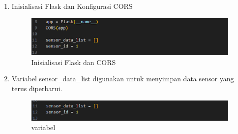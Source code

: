 \begin{enumerate}[label={\alph*.}]
\begin{enumerate}[label={\arabic*.}]
		\item Inisialisasi Flask dan Konfigurasi CORS
		\begin{figure}[H]
			\centering
			\includegraphics[width=0.8\linewidth]{gambar/Dasar teori/Initiate.png}
			\caption{Inisialisasi Flask dan CORS}
			\label{Inisialisasi Flask dan CORS}
		\end{figure}
		
		\item Variabel sensor\_data\_list digunakan untuk menyimpan data sensor yang terus diperbarui.
		\begin{figure}[H]
			\centering
			\includegraphics[width=0.8\linewidth]{gambar/Dasar teori/variabel.png}
			\caption{variabel}
			\label{Inisialisasi Variabel}
		\end{figure}
		

\end{enumerate}
\end{enumerate}
